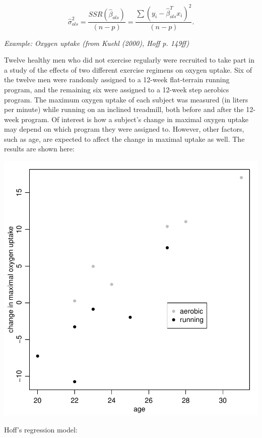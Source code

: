 \documentclass[12pt, a4paper]{article}
\begin{document}
$$\hat{\sigma}^2_{ols} = \frac{SSR\left(\hat{\beta}_{ols}\right)}{(n-p)} = \frac{\sum\left(y_i - \hat{\beta}_{ols}^T x_i\right)^2}{(n-p)}.$$

\clearpage

\textit{Example:  Oxygen uptake (from Kuehl (2000), Hoff p. 149ff)}

Twelve healthy men who did not exercise regularly were recruited to take part in a study of the effects of two different exercise regimens on oxygen uptake.  Six of the twelve men were randomly assigned to a 12-week flat-terrain running program, and the remaining six were assigned to a 12-week step aerobics program.  The maximum oxygen uptake of each subject was measured (in liters per minute) while running on an inclined treadmill, both before and after the 12-week program.  Of interest is how a subject's change in maximal oxygen uptake may depend on which program they were assigned to.  However, other factors, such as age, are expected to affect the change in maximal uptake as well.  The results are shown here:

\includegraphics{Thesis-010}

Hoff's regression model:

\end{document}
